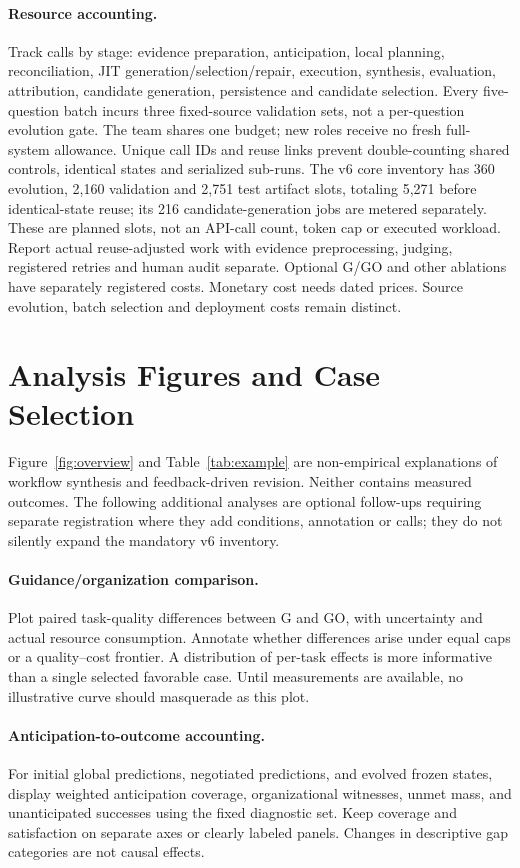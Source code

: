 \paragraph{Resource accounting.}
Track calls by stage: evidence preparation, anticipation, local planning, reconciliation, JIT generation/selection/repair, execution, synthesis, evaluation, attribution, candidate generation, persistence and candidate selection. Every five-question batch incurs three fixed-source validation sets, not a per-question evolution gate. The team shares one budget; new roles receive no fresh full-system allowance. Unique call IDs and reuse links prevent double-counting shared controls, identical states and serialized sub-runs. The v6 core inventory has 360 evolution, 2,160 validation and 2,751 test artifact slots, totaling 5,271 before identical-state reuse; its 216 candidate-generation jobs are metered separately. These are planned slots, not an API-call count, token cap or executed workload. Report actual reuse-adjusted work with evidence preprocessing, judging, registered retries and human audit separate. Optional G/GO and other ablations have separately registered costs. Monetary cost needs dated prices. Source evolution, batch selection and deployment costs remain distinct.

\section{Analysis Figures and Case Selection}

Figure~\ref{fig:overview} and Table~\ref{tab:example} are non-empirical explanations of workflow synthesis and feedback-driven revision. Neither contains measured outcomes. The following additional analyses are optional follow-ups requiring separate registration where they add conditions, annotation or calls; they do not silently expand the mandatory v6 inventory.

\paragraph{Guidance/organization comparison.}
Plot paired task-quality differences between G and GO, with uncertainty and actual resource consumption. Annotate whether differences arise under equal caps or a quality--cost frontier. A distribution of per-task effects is more informative than a single selected favorable case. Until measurements are available, no illustrative curve should masquerade as this plot.

\paragraph{Anticipation-to-outcome accounting.}
For initial global predictions, negotiated predictions, and evolved frozen states, display weighted anticipation coverage, organizational witnesses, unmet mass, and unanticipated successes using the fixed diagnostic set. Keep coverage and satisfaction on separate axes or clearly labeled panels. Changes in descriptive gap categories are not causal effects.

